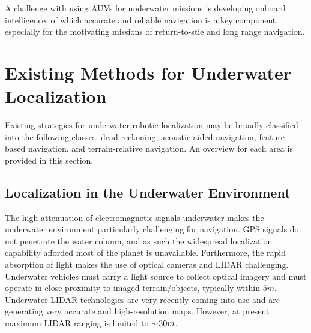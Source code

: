 A challenge with using AUVs for underwater missions is developing onboard intelligence, of which accurate and reliable navigation is a key component, especially for the motivating missions of return-to-stie and long range navigation. 
%

\section{Existing Methods for Underwater Localization}
\label{intro.Existing}

Existing strategies for underwater robotic localization may be broadly classified into the following classes: dead reckoning, acoustic-aided navigation, feature-based navigation, and terrain-relative navigation.  
An overview for each area is provided in this section.  

\subsection{Localization in the Underwater Environment}
\label{intro.Existing.Localization}

The high attenuation of electromagnetic signals underwater makes the underwater environment particularly challenging for navigation.
GPS signals do not penetrate the water column, and as such the widespread localization capability afforded most of the planet is unavailable.  
Furthermore, the rapid absorption of light makes the use of optical cameras and LIDAR challenging.  
Underwater vehicles must carry a light source to collect optical imagery and must operate in close proximity to imaged terrain/objects, typically within $5m$.  
Underwater LIDAR technologies are very recently coming into use and are generating very accurate and high-resolution maps. 
However, at present maximum LIDAR ranging is limited to $ \sim \hspace{-0.5ex} 30m$.

